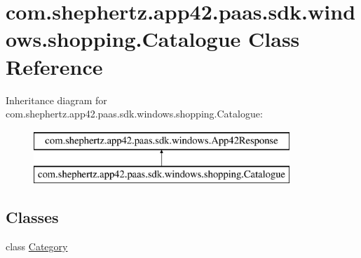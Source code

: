 \hypertarget{classcom_1_1shephertz_1_1app42_1_1paas_1_1sdk_1_1windows_1_1shopping_1_1_catalogue}{\section{com.\+shephertz.\+app42.\+paas.\+sdk.\+windows.\+shopping.\+Catalogue Class Reference}
\label{classcom_1_1shephertz_1_1app42_1_1paas_1_1sdk_1_1windows_1_1shopping_1_1_catalogue}
}
Inheritance diagram for com.\+shephertz.\+app42.\+paas.\+sdk.\+windows.\+shopping.\+Catalogue\+:\begin{figure}[H]
\begin{center}
\leavevmode
\includegraphics[height=2.000000cm]{classcom_1_1shephertz_1_1app42_1_1paas_1_1sdk_1_1windows_1_1shopping_1_1_catalogue}
\end{center}
\end{figure}
\subsection*{Classes}
\begin{DoxyCompactItemize}
\item 
class \hyperlink{classcom_1_1shephertz_1_1app42_1_1paas_1_1sdk_1_1windows_1_1shopping_1_1_catalogue_1_1_category}{Category}
\end{DoxyCompactItemize}
